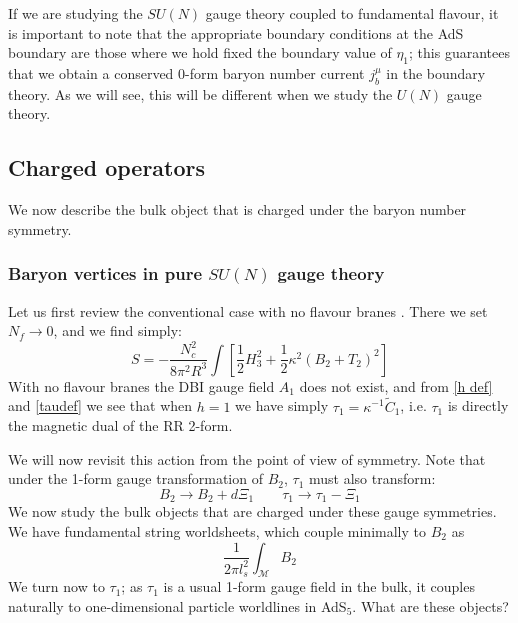 \documentclass[aps,preprint,nofootinbib,preprintnumbers,eqsecnum,superscriptaddress]{revtex4}
\newcommand\sM{{\ensuremath{{\mathcal M}}}}
\begin{document}
If we are studying the $SU(N)$ gauge theory coupled to fundamental flavour, it is important to note that the appropriate boundary conditions at the AdS boundary are those where we hold fixed the boundary value of $\eta_1$; this guarantees that we obtain a conserved $0$-form baryon number current $j^{\mu}_b$ in the boundary theory. As we will see, this will be different when we study the $U(N)$ gauge theory. 

\subsection{Charged operators}
We now describe the bulk object that is charged under the baryon number symmetry. 

\subsubsection{Baryon vertices in pure \texorpdfstring{$SU(N)$}{SU(N)} gauge theory}
Let us first review the conventional case with no flavour branes \cite{Witten:1998xy}. There we set $N_f \to 0$, and we find simply:
\begin{equation}
	S = -\frac{N_c^2}{8 \pi^2 R^3}\int{\left[\frac{1}{2} H_3^2 + \frac{1}{2} \kappa^2 (B_2 + T_2)^2 \right]}
\end{equation}
With no flavour branes the DBI gauge field $A_1$ does not exist, and from \eqref{h def} and \eqref{taudef} we see that when $h = 1$ we have simply $\tau_1 = \kappa^{-1} \tilde{C}_1$, i.e. $\tau_1$ is directly the magnetic dual of the RR 2-form. 

We will now revisit this action from the point of view of symmetry. Note that under the 1-form gauge transformation of $B_2$, $\tau_1$ must also transform:
\begin{equation}
B_2 \to B_2 + d\Xi_{1} \qquad \tau_1 \to \tau_1 - \Xi_{1} \label{xitrans} 
\end{equation}
We now study the bulk objects that are charged under these gauge symmetries. We have fundamental string worldsheets, which couple minimally to $B_2$ as
\begin{equation}
\frac{1}{2\pi l_{s}^2} \int_{\sM} B_2 
\end{equation}
We turn now to $\tau_1$; as $\tau_1$ is a usual 1-form gauge field in the bulk, it couples naturally to one-dimensional particle worldlines in AdS$_5$. What are these objects? 
\end{document}
